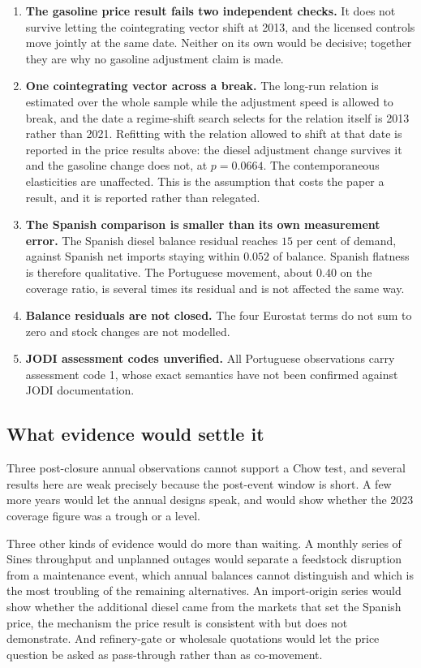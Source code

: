 \documentclass[11pt,a4paper]{article}
\begin{document}
\begin{enumerate}
\item \textbf{The gasoline price result fails two independent checks.} It does not survive
letting the cointegrating vector shift at 2013, and the licensed controls move jointly at the
same date. Neither on its own would be decisive; together they are why no gasoline adjustment
claim is made.
\item \textbf{One cointegrating vector across a break.} The long-run relation is estimated over
the whole sample while the adjustment speed is allowed to break, and the date a regime-shift
search selects for the relation itself is 2013 rather than 2021. Refitting with the relation
allowed to shift at that date is reported in the price results above: the diesel adjustment
change survives it and the gasoline change does not, at $p=0.0664$. The contemporaneous
elasticities are unaffected. This is the assumption that costs the paper a result, and it is
reported rather than relegated.
\item \textbf{The Spanish comparison is smaller than its own measurement error.} The Spanish
diesel balance residual reaches $15$ per cent of demand, against Spanish net imports staying
within $0.052$ of balance. Spanish flatness is therefore qualitative. The Portuguese movement,
about $0.40$ on the coverage ratio, is several times its residual and is not affected the same
way.
\item \textbf{Balance residuals are not closed.} The four Eurostat terms do not sum to zero and
stock changes are not modelled.
\item \textbf{JODI assessment codes unverified.} All Portuguese observations carry assessment
code 1, whose exact semantics have not been confirmed against JODI documentation.
\end{enumerate}

\subsection{What evidence would settle it}

Three post-closure annual observations cannot support a Chow test, and several results here are
weak precisely because the post-event window is short. A few more years would let the annual
designs speak, and would show whether the 2023 coverage figure was a trough or a level.

Three other kinds of evidence would do more than waiting. A monthly series of Sines throughput
and unplanned outages would separate a feedstock disruption from a maintenance event, which
annual balances cannot distinguish and which is the most troubling of the remaining alternatives.
An import-origin series would show whether the additional diesel came from the markets that set
the Spanish price, the mechanism the price result is consistent with but does not demonstrate.
And refinery-gate or wholesale quotations would let the price question be asked as pass-through
rather than as co-movement.
\end{document}
